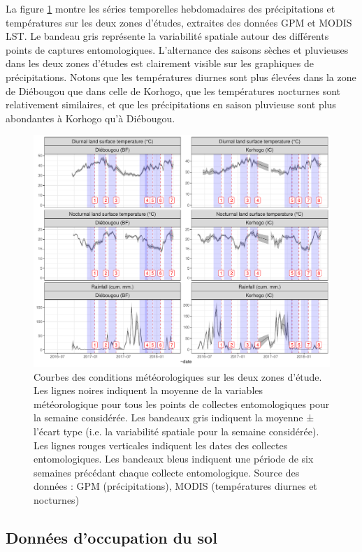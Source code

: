 \documentclass[12pt,twoside]{reedthesis}
\begin{document}
La figure \ref{fig:plot-pastweather} montre les séries temporelles hebdomadaires des précipitations et températures sur les deux zones d'études, extraites des données GPM et MODIS LST. Le bandeau gris représente la variabilité spatiale autour des différents points de captures entomologiques. L'alternance des saisons sèches et pluvieuses dans les deux zones d'études est clairement visible sur les graphiques de précipitations. Notons que les températures diurnes sont plus élevées dans la zone de Diébougou que dans celle de Korhogo, que les températures nocturnes sont relativement similaires, et que les précipitations en saison pluvieuse sont plus abondantes à Korhogo qu'à Diébougou.
\begin{figure}

{\centering \includegraphics[width=1\linewidth]{figure/plot_pastweather} 

}

\caption[Courbes des conditions météorologiques sur les deux zones d'étude]{Courbes des conditions météorologiques sur les deux zones d'étude. Les lignes noires indiquent la moyenne de la variables météorologique pour tous les points de collectes entomologiques pour la semaine considérée.
 Les bandeaux gris indiquent la moyenne ± l'écart type (i.e. la variabilité spatiale pour la semaine considérée).
 Les lignes rouges verticales indiquent les dates des collectes entomologiques.
Les bandeaux bleus indiquent une période de six semaines précédant chaque collecte entomologique.
Source des données : GPM (précipitations), MODIS (températures diurnes et nocturnes)}\label{fig:plot-pastweather}
\end{figure}
\hypertarget{landcover-data}{%
\subsection{Données d'occupation du sol}\label{landcover-data}}
\end{document}
